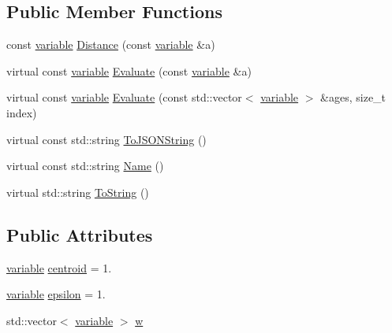 \subsection*{Public Member Functions}
\begin{DoxyCompactItemize}
\item 
const \hyperlink{structmas_1_1_gaussian_r_b_f_a6aa7c2aa04e8a70a63c751cf240b37ab}{variable} \hyperlink{structmas_1_1_gaussian_r_b_f_add49065f4c597720e164588d5eece123}{Distance} (const \hyperlink{structmas_1_1_gaussian_r_b_f_a6aa7c2aa04e8a70a63c751cf240b37ab}{variable} \&a)
\item 
virtual const \hyperlink{structmas_1_1_gaussian_r_b_f_a6aa7c2aa04e8a70a63c751cf240b37ab}{variable} \hyperlink{structmas_1_1_gaussian_r_b_f_a29fededb3644678ef80d7c65f601dfae}{Evaluate} (const \hyperlink{structmas_1_1_gaussian_r_b_f_a6aa7c2aa04e8a70a63c751cf240b37ab}{variable} \&a)
\item 
virtual const \hyperlink{structmas_1_1_gaussian_r_b_f_a6aa7c2aa04e8a70a63c751cf240b37ab}{variable} \hyperlink{structmas_1_1_gaussian_r_b_f_a7710758db50657d20d5baf403713df87}{Evaluate} (const std\-::vector$<$ \hyperlink{structmas_1_1_gaussian_r_b_f_a6aa7c2aa04e8a70a63c751cf240b37ab}{variable} $>$ \&ages, size\-\_\-t index)
\item 
virtual const std\-::string \hyperlink{structmas_1_1_gaussian_r_b_f_a0b07e709655b2c7da7c89dd48491d091}{To\-J\-S\-O\-N\-String} ()
\item 
virtual const std\-::string \hyperlink{structmas_1_1_gaussian_r_b_f_a41b0813587b13d6b62dc5eedac91cc93}{Name} ()
\item 
virtual std\-::string \hyperlink{structmas_1_1_gaussian_r_b_f_a08856503cb0e77c17f891621aef50d21}{To\-String} ()
\end{DoxyCompactItemize}
\subsection*{Public Attributes}
\begin{DoxyCompactItemize}
\item 
\hyperlink{structmas_1_1_gaussian_r_b_f_a6aa7c2aa04e8a70a63c751cf240b37ab}{variable} \hyperlink{structmas_1_1_gaussian_r_b_f_ac42ac2ea9ca3bcb5c648f9829c34ee45}{centroid} = 1.
\item 
\hyperlink{structmas_1_1_gaussian_r_b_f_a6aa7c2aa04e8a70a63c751cf240b37ab}{variable} \hyperlink{structmas_1_1_gaussian_r_b_f_a77f2e2c11d1166255d43e81853bc21a3}{epsilon} = 1.
\item 
std\-::vector$<$ \hyperlink{structmas_1_1_gaussian_r_b_f_a6aa7c2aa04e8a70a63c751cf240b37ab}{variable} $>$ \hyperlink{structmas_1_1_gaussian_r_b_f_a47643c5b8933dfaa3c501effbf190639}{w}
\end{DoxyCompactItemize}


